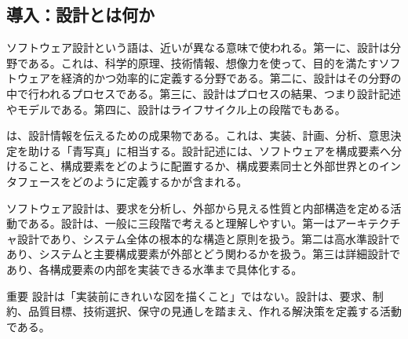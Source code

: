 \subsection*{導入：設計とは何か}

ソフトウェア設計という語は、近いが異なる意味で使われる。第一に、設計は分野である。これは、科学的原理、技術情報、想像力を使って、目的を満たすソフトウェアを経済的かつ効率的に定義する分野である。第二に、設計はその分野の中で行われるプロセスである。第三に、設計はプロセスの結果、つまり設計記述やモデルである。第四に、設計はライフサイクル上の段階でもある。

 は、設計情報を伝えるための成果物である。これは、実装、計画、分析、意思決定を助ける「青写真」に相当する。設計記述には、ソフトウェアを構成要素へ分けること、構成要素をどのように配置するか、構成要素同士と外部世界とのインタフェースをどのように定義するかが含まれる。

ソフトウェア設計は、要求を分析し、外部から見える性質と内部構造を定める活動である。設計は、一般に三段階で考えると理解しやすい。第一はアーキテクチャ設計であり、システム全体の根本的な構造と原則を扱う。第二は高水準設計であり、システムと主要構成要素が外部とどう関わるかを扱う。第三は詳細設計であり、各構成要素の内部を実装できる水準まで具体化する。

\begin{pointbox}{重要}
設計は「実装前にきれいな図を描くこと」ではない。設計は、要求、制約、品質目標、技術選択、保守の見通しを踏まえ、作れる解決策を定義する活動である。
\end{pointbox}

